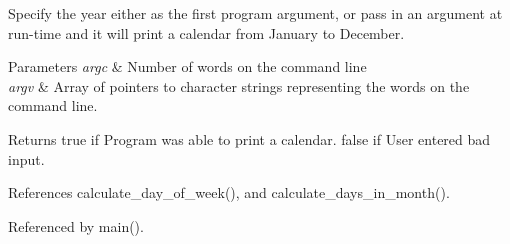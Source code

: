 Specify the year either as the first program argument, or pass in an argument at run-\/time and it will print a calendar from January to December. 
\begin{DoxyParams}{Parameters}
{\em argc} & Number of words on the command line \\
\hline
{\em argv} & Array of pointers to character strings representing the words on the command line. \\
\hline
\end{DoxyParams}
\begin{DoxyReturn}{Returns}
true if Program was able to print a calendar. false if User entered bad input. 
\end{DoxyReturn}


References calculate\+\_\+day\+\_\+of\+\_\+week(), and calculate\+\_\+days\+\_\+in\+\_\+month().



Referenced by main().

